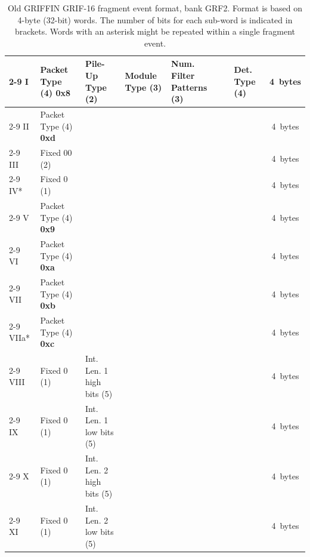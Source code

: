 \documentclass[letterpaper,12pt,notitlepage]{report}
\begin{document}
\begin{landscape}
\begin{table}
\caption{Old GRIFFIN GRIF-16 fragment event format, bank GRF2. Format is based on 4-byte (32-bit) words. The number of bits for each sub-word is indicated in brackets. Words with an asterisk might be repeated within a single fragment event.}
\begin{tabular*}{\textwidth}{p{0.9cm}|p{2.25cm}|p{2.2cm}|p{2.2cm}|p{2.2cm}|p{2.2cm}|p{2.2cm}|p{2.2cm}|p{2.2cm}|c}
\cline{2-9}
I& Packet Type (4) {\bf 0x8} & Pile-Up Type (2) & Module Type (3) & Num. Filter Patterns (3) & \multicolumn{3}{p{6.6cm}|}{\centering{Address (16)}} & Det. Type (4) & 4~bytes\\
\cline{2-9}
II & Packet Type (4) {\bf 0xd} & \multicolumn{7}{p{15.4cm}|}{\centering{Network Packet Counter Value (28)}} & 4~bytes\\
\cline{2-9}
III & Fixed 00 (2) & \multicolumn{3}{p{6.6cm}|}{\centering{Filter Patterns (14)}} & \multicolumn{4}{p{8.8cm}|}{\centering{PPG pattern (10)}} & 4~bytes\\
\cline{2-9}
IV* & Fixed 0 (1) & \multicolumn{7}{p{15.4cm}|}{\centering{Filter Condition Counter Value (31)}} & 4~bytes\\
\cline{2-9}
V & Packet Type (4) {\bf 0x9} & \multicolumn{7}{p{15.4cm}|}{\centering{Channel Hit Detection Counter Value (28)}} & 4~bytes\\
\cline{2-9}
VI & Packet Type (4) {\bf 0xa} & \multicolumn{7}{p{15.4cm}|}{\centering{Time Stamp low bits (28)}} & 4~bytes\\
\cline{2-9}
VII & Packet Type (4) {\bf 0xb} & \multicolumn{3}{p{6.6cm}|}{\centering{Deadtime (14)}} & \multicolumn{4}{p{8.8cm}|}{\centering{Time Stamp high bits (14)}} & 4~bytes\\
\cline{2-9}
VIIa* & Packet Type (4) {\bf 0xc} & \multicolumn{7}{p{15.4cm}|}{\centering{Waveform Sample (28)}} & 4~bytes\\
\cline{2-9}
VIII & Fixed 0 (1) & Int. Len. 1 high bits (5) & \multicolumn{6}{p{13.2cm}|}{\centering{Pulse Height 1 (26)}} & 4~bytes\\
\cline{2-9}
IX & Fixed 0 (1) & Int. Len. 1 low bits (5) & \multicolumn{6}{p{13.2cm}|}{\centering{CFD 1 (26)}} & 4~bytes\\
\cline{2-9}
X & Fixed 0 (1) & Int. Len. 2 high bits (5) & \multicolumn{6}{p{13.2cm}|}{\centering{Pulse Height 2 (26)}} & 4~bytes\\
\cline{2-9}
XI & Fixed 0 (1) & Int. Len. 2 low bits (5) & \multicolumn{6}{p{13.2cm}|}{\centering{CFD 2 (26)}} & 4~bytes\\

\end{tabular*}
\end{table}
\end{landscape}
\end{document}
